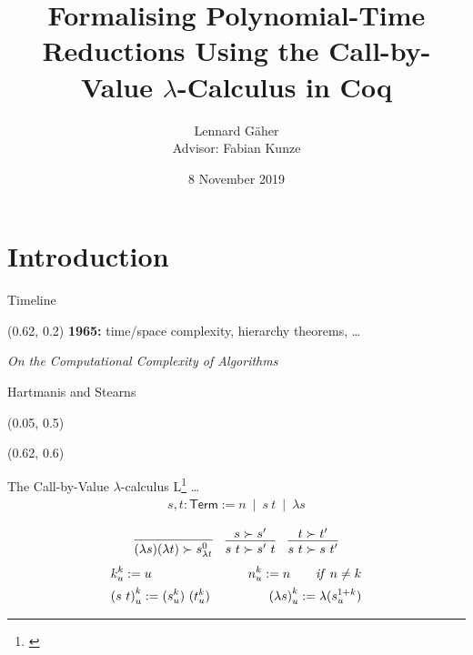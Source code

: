 \documentclass[11pt,usenames,dvipsnames,
  hyperref={pdfencoding=auto,psdextra}]{beamer}
\title{Formalising Polynomial-Time Reductions Using the Call-by-Value $\lambda$-Calculus in Coq}
\institute{Saarland University}
\date{8 November 2019}
\author{Lennard Gäher\\[1mm] {\small{Advisor: Fabian Kunze}}}
\let\otp\titlepage
\renewcommand{\titlepage}{\otp\addtocounter{framenumber}{-1}}
\newcommand{\bnfmid}{~\mid~}
\begin{document}
\begin{frame}[plain]
  \titlepage
\end{frame}

\section{Introduction}
\begin{frame}{Timeline}

  \setlength{\TPHorizModule}{\textwidth}
  \setlength{\TPVertModule}{\textwidth}
  \begin{textblock}{0.5} (0.62, 0.2)
    \small
    \textbf{1965:} time/space complexity, hierarchy theorems, \ldots

    \emph{On the Computational Complexity of Algorithms}

    Hartmanis and Stearns
  \end{textblock}

    \begin{textblock}{0.5} (0.05, 0.5)
    \end{textblock}

    \begin{textblock}{0.5} (0.62, 0.6)
    \end{textblock}
\end{frame}

\newcommand{\Term}{\textsf{Term}}

\begin{frame}{The Call-by-Value $\lambda$-calculus L\footnote{\cite{ForsterSmolka:2017:L-Computability}} \ldots}
  \begin{align*}
    s, t : \Term := n \bnfmid s~t \bnfmid \lambda s
  \end{align*}

  \begin{align*}
    \infer{(\lambda s)(\lambda t) \succ s^0_{\lambda t}}{}
    && 
    \infer{s~t \succ s'~t}{s \succ s'}
    && 
    \infer{s~t \succ s~t'}{t \succ t'}
  \end{align*}
  \begin{alignat*}{2}
    &k^k_u := u \qquad& n^k_u := n \qquad \mathit{if}~n\neq k \\
    & {(s~t)}^k_u := (s^k_u)~(t^k_u) 
    \qquad & {(\lambda s)}^k_u := \lambda(s^{\natS k}_u)
  \end{alignat*}
\end{frame}
\end{document}
